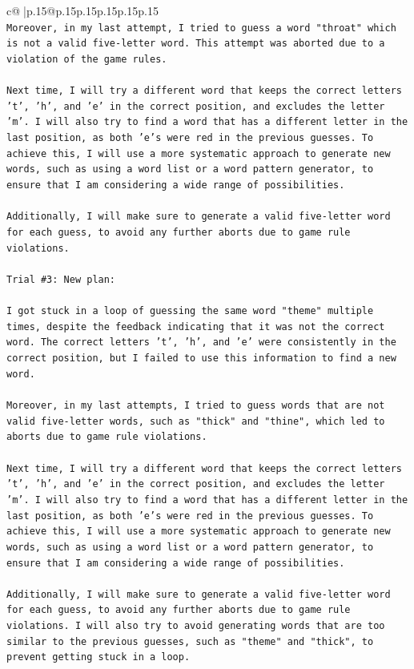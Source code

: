 \documentclass{article}
\begin{document}
{\begin{supertabular}{c@{$\;$}|p{.15\linewidth}@{}p{.15\linewidth}p{.15\linewidth}p{.15\linewidth}p{.15\linewidth}p{.15\linewidth}}
{{{\\ 
\texttt{Moreover, in my last attempt, I tried to guess a word "throat" which is not a valid five{-}letter word. This attempt was aborted due to a violation of the game rules.} \\
\\ 
\texttt{Next time, I will try a different word that keeps the correct letters 't', 'h', and 'e' in the correct position, and excludes the letter 'm'. I will also try to find a word that has a different letter in the last position, as both 'e's were red in the previous guesses. To achieve this, I will use a more systematic approach to generate new words, such as using a word list or a word pattern generator, to ensure that I am considering a wide range of possibilities. } \\
\\ 
\texttt{Additionally, I will make sure to generate a valid five{-}letter word for each guess, to avoid any further aborts due to game rule violations.} \\
\\ 
\texttt{Trial \#3: New plan: } \\
\\ 
\texttt{I got stuck in a loop of guessing the same word "theme" multiple times, despite the feedback indicating that it was not the correct word. The correct letters 't', 'h', and 'e' were consistently in the correct position, but I failed to use this information to find a new word. } \\
\\ 
\texttt{Moreover, in my last attempts, I tried to guess words that are not valid five{-}letter words, such as "thick" and "thine", which led to aborts due to game rule violations.} \\
\\ 
\texttt{Next time, I will try a different word that keeps the correct letters 't', 'h', and 'e' in the correct position, and excludes the letter 'm'. I will also try to find a word that has a different letter in the last position, as both 'e's were red in the previous guesses. To achieve this, I will use a more systematic approach to generate new words, such as using a word list or a word pattern generator, to ensure that I am considering a wide range of possibilities. } \\
\\ 
\texttt{Additionally, I will make sure to generate a valid five{-}letter word for each guess, to avoid any further aborts due to game rule violations. I will also try to avoid generating words that are too similar to the previous guesses, such as "theme" and "thick", to prevent getting stuck in a loop. } \\
}}}
\end{supertabular}}
\end{document}
